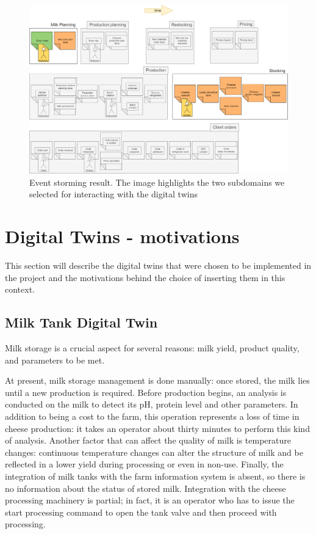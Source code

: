 \begin{figure}[H]
	\centering
	\includegraphics[width=\textwidth]{img/event-storming.png}
	\caption{Event storming result. The image highlights the two subdomains we selected for interacting with the digital twins}
	\label{img:event-storming}
\end{figure}

\section{Digital Twins - motivations}\label{sec:dt-motivations}
This section will describe the digital twins that were chosen to be implemented in the project and the motivations behind the choice of inserting them in this context.

\subsection{Milk Tank Digital Twin}
Milk storage is a crucial aspect for several reasons: milk yield, product quality, and parameters to be met.

At present, milk storage management is done manually: once stored, the milk lies until a new production is required.
Before production begins, an analysis is conducted on the milk to detect its pH, protein level and other parameters.
In addition to being a cost to the farm, this operation represents a loss of time in cheese production: it takes an operator about thirty minutes to
perform this kind of analysis.
Another factor that can affect the quality of milk is temperature changes: continuous temperature changes can alter the structure of milk and be 
reflected in a lower yield during processing or even in non-use.
Finally, the integration of milk tanks with the farm information system is absent, so there is no information about the status of stored milk.
Integration with the cheese processing machinery is partial; in fact, it is an operator who has to issue the start processing command to open the 
tank valve and then proceed with processing.

